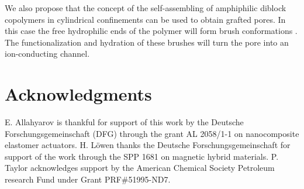 \documentclass[3p,english,preprint]{elsarticle}
\begin{document}
We also propose  that the  concept of the  self-assembling
of  amphiphilic diblock copolymers 
in cylindrical confinements \cite{xiang-2004,srinivas-2004}
can be used to obtain grafted pores. In this case the free hydrophilic ends of the polymer
will form brush conformations \cite{dimitrov-2006,kouts-2009}. 
The functionalization and hydration of these brushes will turn the pore 
into an ion-conducting channel.
 












\vspace{0.5cm}
\section*{Acknowledgments}
E. Allahyarov is thankful for support of this work by 
the Deutsche Forschungsgemeinschaft (DFG)  through the grant 
AL 2058/1-1 on nanocomposite elastomer actuators. 
H. L\"owen thanks the Deutsche Forschungsgemeinschaft
 for support of the work through the SPP 1681 on magnetic hybrid materials.
P. Taylor acknowledges support by the 
American Chemical Society Petroleum research Fund under Grant PRF\#51995-ND7.
\end{document}
